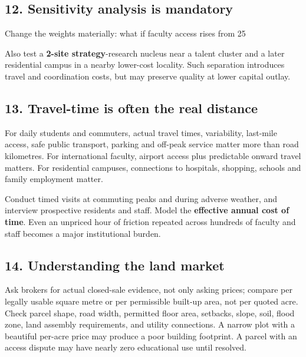 \subsection{12. Sensitivity analysis is mandatory}

Change the weights materially: what if faculty access rises from 25%

Also test a \textbf{2-site strategy}-research nucleus near a talent cluster and a later residential campus in a nearby lower-cost locality. Such separation introduces travel and coordination costs, but may preserve quality at lower capital outlay.


\subsection{13. Travel-time is often the real distance}

For daily students and commuters, actual travel times, variability, last-mile access, safe public transport, parking and off-peak service matter more than road kilometres. For international faculty, airport access plus predictable onward travel matters. For residential campuses, connections to hospitals, shopping, schools and family employment matter.

Conduct timed visits at commuting peaks and during adverse weather, and interview prospective residents and staff. Model the \textbf{effective annual cost of time}. Even an unpriced hour of friction repeated across hundreds of faculty and staff becomes a major institutional burden.


\subsection{14. Understanding the land market}

Ask brokers for actual closed-sale evidence, not only asking prices; compare per legally usable square metre or per permissible built-up area, not per quoted acre. Check parcel shape, road width, permitted floor area, setbacks, slope, soil, flood zone, land assembly requirements, and utility connections. A narrow plot with a beautiful per-acre price may produce a poor building footprint. A parcel with an access dispute may have nearly zero educational use until resolved.

